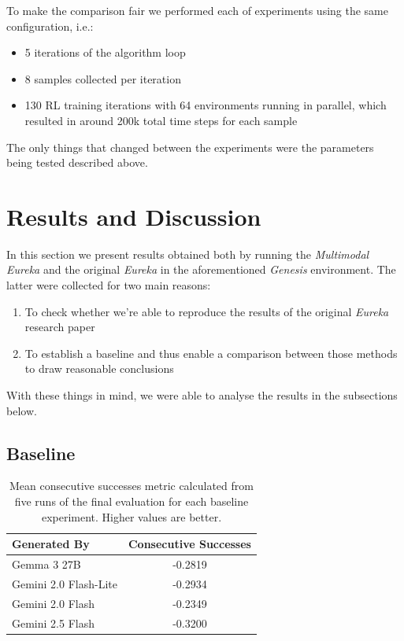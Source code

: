 \documentclass[10pt,twocolumn]{article}
\begin{document}
To make the comparison fair we performed each of experiments using the same configuration, i.e.:

\begin{itemize}
    \item 5 iterations of the algorithm loop
    \item 8 samples collected per iteration
    \item 130 RL training iterations with 64 environments running in parallel, which resulted in around 200k total time steps for each sample
\end{itemize}

The only things that changed between the experiments were the parameters being tested described above.

\section{Results and Discussion}

In this section we present results obtained both by running the \textit{Multimodal Eureka} and the original \textit{Eureka} in the aforementioned \textit{Genesis} environment. The latter were collected for two main reasons:

\begin{enumerate}
    \item To check whether we're able to reproduce the results of the original \textit{Eureka} research paper
    \item To establish a baseline and thus enable a comparison between those methods to draw reasonable conclusions
\end{enumerate}

With these things in mind, we were able to analyse the results in the subsections below.

\subsection{Baseline}

\begin{table}
    \centering
    \begin{tabular}{|l|c|}
        \hline
        Generated By              & Consecutive Successes \\
        \hline
        Gemma 3 27B               & -0.2819               \\
        Gemini 2.0 Flash-Lite     & -0.2934               \\
        Gemini 2.0 Flash          & -0.2349               \\
        Gemini 2.5 Flash          & -0.3200               \\
        \hline
    \end{tabular}
    \caption{Mean consecutive successes metric calculated from five runs of the final evaluation for each baseline experiment. Higher values are better.}
    \label{tab:baseline_results}
\end{table}
\end{document}
